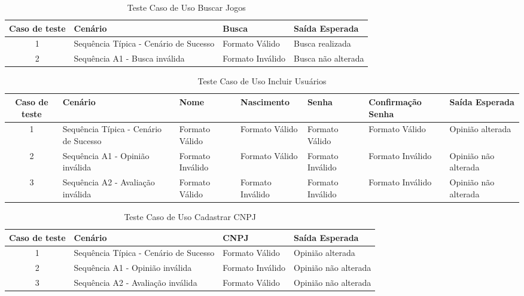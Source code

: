 \documentclass[a4paper,11pt]{article}
\begin{document}
	\begin{center}
	\begin{table}[H]
		\begin{tabularx}{\textwidth}{c|X|X|X}
			\textbf{Caso de teste} & \textbf{Cenário} & \textbf{Busca} & \textbf{Saída Esperada} \\
			\hline
			1 & Sequência Típica - Cenário de Sucesso & Formato Válido & Busca realizada\\ \hline
			2 & Sequência A1 - Busca inválida & Formato Inválido & Busca não alterada\\ \hline
			
		\end{tabularx}
		\caption{Teste Caso de Uso Buscar Jogos}
	\end{table}
	\end{center}
	
	\begin{center}
	\begin{table}[H]
		\begin{tabularx}{\textwidth}{c|X|X|X|X|X|X}
			\textbf{Caso de teste} & \textbf{Cenário} & \textbf{Nome} & \textbf{Nascimento} & \textbf{Senha} & \textbf{Confirmação Senha} & \textbf{Saída Esperada} \\
			\hline
			1 & Sequência Típica - Cenário de Sucesso & Formato Válido & Formato Válido & Formato Válido & Formato Válido & Opinião alterada\\ \hline
			2 & Sequência A1 - Opinião inválida & Formato Inválido & Formato Válido & Formato Inválido & Formato Inválido & Opinião não alterada\\ \hline
			3 & Sequência A2 - Avaliação inválida & Formato Válido & Formato Inválido & Formato Inválido & Formato Inválido & Opinião não alterada\\ \hline
			
		\end{tabularx}
		\caption{Teste Caso de Uso Incluir Usuários}
	\end{table}
	\end{center}
	
	\begin{center}
	\begin{table}[H]
		\begin{tabularx}{\textwidth}{c|X|X|X}
			\textbf{Caso de teste} & \textbf{Cenário} & \textbf{CNPJ} & \textbf{Saída Esperada} \\
			\hline
			1 & Sequência Típica - Cenário de Sucesso & Formato Válido & Opinião alterada\\ \hline
			2 & Sequência A1 - Opinião inválida & Formato Inválido & Opinião não alterada\\ \hline
			3 & Sequência A2 - Avaliação inválida & Formato Válido & Opinião não alterada\\ \hline
			
		\end{tabularx}
		\caption{Teste Caso de Uso Cadastrar CNPJ}
	\end{table}
	\end{center}
	
\end{document}
